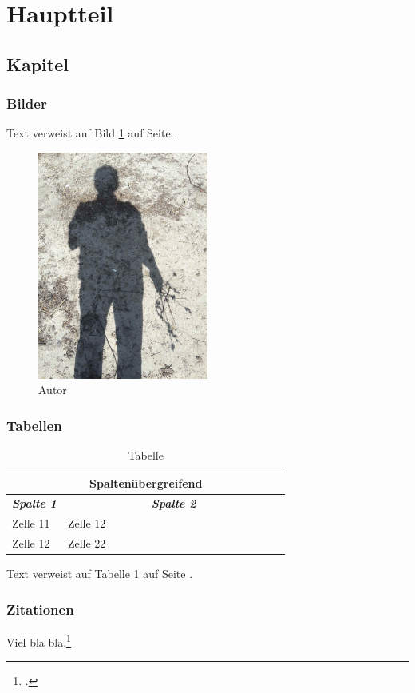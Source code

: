 \section{Hauptteil}
\subsection{Kapitel}
\subsubsection{Bilder}
Text verweist auf Bild \ref{image:autor} auf Seite \pageref{image:autor}.
\begin{figure}[h]
  \centering
  \includegraphics[width=0.5\textwidth]{img/image.jpg}
  \caption{Autor}
  \label{image:autor}
\end{figure}

\subsubsection{Tabellen}
\begin{table}[htbp]
\centering
\begin{tabular}{|l|p{0.8\linewidth}|}
\hline
\multicolumn{2}{|c|}{\textbf{Spaltenübergreifend}}
\tabularnewline \hline
\multicolumn{1}{|c|}{\textit{\textbf{Spalte 1}}} & \multicolumn{1}{c|}{\textit{\textbf{Spalte 2}}}
\tabularnewline \hline
Zelle 11 & Zelle 12
\tabularnewline \hline
Zelle 12 & Zelle 22
\tabularnewline \hline
\end{tabular}
\caption{Tabelle}
\label{table:tabelle}
\end{table}
Text verweist auf Tabelle \ref{table:tabelle} auf Seite \pageref{table:tabelle}.

\subsubsection{Zitationen}
Viel bla bla.\footnote{\cite[S. 11ff]{autor1}.}

\newpage
